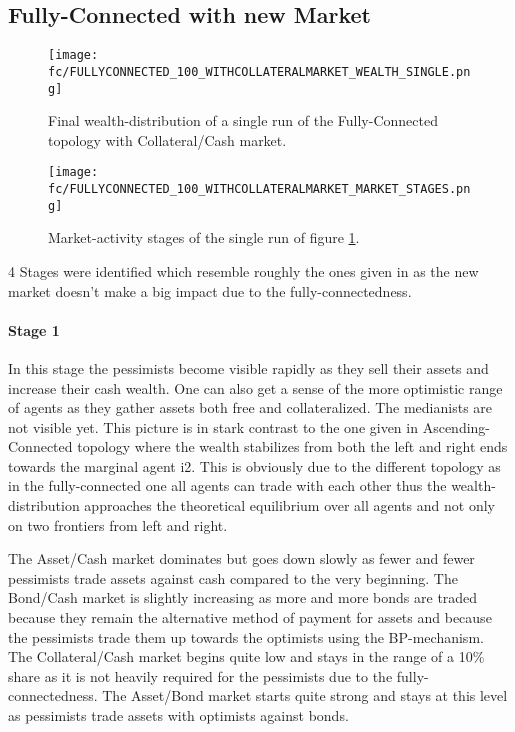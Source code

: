 \documentclass[Bachelorarbeit.tex]{subfiles}
\begin{document}
\subsection{Fully-Connected with new Market}

\begin{figure}[H]
	\centering
  \texttt{[image: fc/FULLYCONNECTED\_100\_WITHCOLLATERALMARKET\_WEALTH\_SINGLE.png]}
  	\caption{Final wealth-distribution of a single run of the Fully-Connected topology with Collateral/Cash market.}
	\label{fig:wealth_FULLYCONNECTED_100_WITHCOLLATERALMARKET_WEALTH_SINGLE}
\end{figure}

\begin{figure}[H]
	\centering
  \texttt{[image: fc/FULLYCONNECTED\_100\_WITHCOLLATERALMARKET\_MARKET\_STAGES.png]}
  	\caption{Market-activity stages of the single run of figure \ref{fig:wealth_FULLYCONNECTED_100_WITHCOLLATERALMARKET_WEALTH_SINGLE}.}
	\label{fig:markets_FULLYCONNECTED_100_WITHCOLLATERALMARKET_MARKET_STAGES}
\end{figure}

4 Stages were identified which resemble roughly the ones given in \cite{Breuer2015} as the new market doesn't make a big impact due to the fully-connectedness.


\paragraph{Stage 1}
In this stage the pessimists become visible rapidly as they sell their assets and increase their cash wealth. One can also get a sense of the more optimistic range of agents as they gather assets both free and collateralized. The medianists are not visible yet. This picture is in stark contrast to the one given in Ascending-Connected topology where the wealth stabilizes from both the left and right ends towards the marginal agent i2. This is obviously due to the different topology as in the fully-connected one all agents can trade with each other thus the wealth-distribution approaches the theoretical equilibrium over all agents and not only on two frontiers from left and right.

\medskip

The Asset/Cash market dominates but goes down slowly as fewer and fewer pessimists trade assets against cash compared to the very beginning. The Bond/Cash market is slightly increasing as more and more bonds are traded because they remain the alternative method of payment for assets and because the pessimists trade them up towards the optimists using the BP-mechanism. The Collateral/Cash market begins quite low and stays in the range of a 10\% share as it is not heavily required for the pessimists due to the fully-connectedness. The Asset/Bond market starts quite strong and stays at this level as pessimists trade assets with optimists against bonds.
\end{document}
